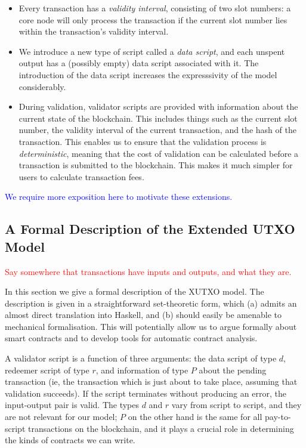 \documentclass[a4paper]{article}
\newcommand{\red}[1]{\textcolor{red}{#1}}
\newcommand{\blue}[1]{\textcolor{blue}{#1}}
\renewcommand{\i}{\textit}  %
\theoremstyle{definition}  %
\begin{document}
\begin{itemize}
\item Every transaction has a \textit{validity interval}, consisting
  of two slot numbers: a core node will only process the transaction
  if the current slot number lies within the transaction's validity
  interval.
\item We introduce a new type of script called a \i{data script},
  and each unspent output has a (possibly empty) data script
  associated with it.  The introduction of the data script
  increases the expresssivity of the model considerably.
\item During validation, validator scripts are provided with
  information about the current state of the blockchain.  This
  includes things such as the current slot number, the validity
  interval of the current transaction, and the hash of the
  transaction.  This enables us to ensure that the validation process
  is \i{deterministic}, meaning that the cost of validation can be
  calculated before a transaction is submitted to the blockchain.
  This makes it much simpler for users to calculate transaction fees.
\end{itemize}
  

\noindent\blue{We require more exposition here to motivate these extensions.}

\subsection{A Formal Description of the Extended UTXO Model}
\label{section:xutxo-spec}
\red{Say somewhere that transactions have inputs and outputs, and what they are.}

In this section we give a formal description of the XUTXO model.  The
description is given in a straightforward set-theoretic form, which
(a) admits an almost direct translation into Haskell, and (b) should
easily be amenable to mechanical formalisation.  This will potentially
allow us to argue formally about smart contracts and to develop tools
for automatic contract analysis.

A validator script is a function of three arguments: the data script
of type $d$, redeemer script of type $r$, and information of type $P$
about the pending transaction (ie, the transaction which is
  just about to take place, assuming that validation succeeds).  If
the script terminates without producing an error, the input-output
pair is valid. The types $d$ and $r$ vary from script to script, and
they are not relevant for our model; $P$ on the other hand is the same
for all pay-to-script transactions on the blockchain, and it plays a
crucial role in determining the kinds of contracts we can write.
\end{document}
